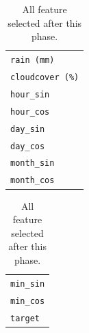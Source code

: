\begin{table}[H]
\begin{center}
\begin{tabular}[t]{l|}
			\verb|rain (mm)|                    \\
			\verb|cloudcover (%)|               \\
			\verb|hour_sin|                     \\
			\verb|hour_cos|                     \\
			\verb|day_sin|                      \\
			\verb|day_cos|                      \\
			\verb|month_sin|                    \\
			\verb|month_cos|
		\end{tabular}
		\begin{tabular}[t]{l}
			\verb|min_sin| \\
			\verb|min_cos| \\
			\verb|target|
		\end{tabular}
	\end{center}
	\caption{All feature selected after this phase.}\label{tab:featselected}
\end{table}


